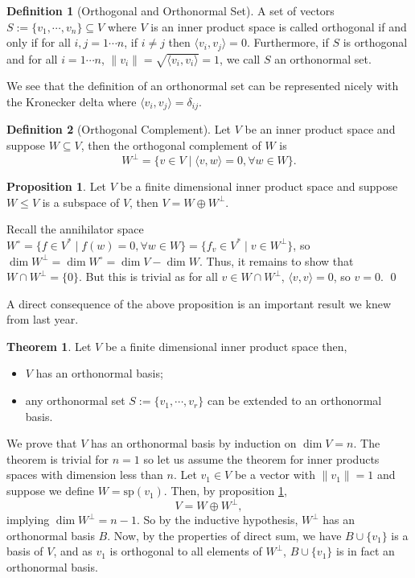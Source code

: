 \documentclass[
]{article}
\theoremstyle{definition}
\newtheorem{theorem}{Theorem}
\newtheorem{prop}{Proposition}[section]
\theoremstyle{definition}
\newtheorem{definition}{Definition}[section]
\begin{document}
\begin{definition}[Orthogonal and Orthonormal Set]
  A set of vectors \(S := \{v_1, \cdots, v_n\} \subseteq V\) where \(V\) is 
  an inner product space is called orthogonal if and only if for all 
  \(i, j = 1 \cdots n\), if \(i \neq j\) then \(\langle v_i, v_j \rangle = 0\). 
  Furthermore, if \(S\) is orthogonal and for all \(i = 1 \cdots n\), 
  \(\| v_i \| = \sqrt{\langle v_i, v_i \rangle} = 1\), we call \(S\) an 
  orthonormal set.
\end{definition}

We see that the definition of an orthonormal set can be represented
nicely with the Kronecker delta where
\(\langle v_i, v_j \rangle = \delta_{ij}\).

\begin{definition}[Orthogonal Complement]
  Let \(V\) be an inner product space and suppose \(W \subseteq V\), then the 
  orthogonal complement of \(W\) is 
  \[W^{\bot} = \{v \in V \mid \langle v, w \rangle = 0, \forall w \in W\}.\]
\end{definition}

\begin{prop}\label{dsumorth}
  Let \(V\) be a finite dimensional inner product space and suppose \(W \le V\) 
  is a subspace of \(V\), then \(V = W \oplus W^\bot\).
\end{prop}
\proof

Recall the annihilator space
\(W^\circ = \{f \in V^* \mid f(w) = 0, \forall w \in W\}  = \{f_v \in V^* \mid v \in W^\bot\}\),
so \(\dim W^\bot = \dim W^\circ =  \dim V - \dim W\). Thus, it remains
to show that \(W \cap W^\bot = \{0\}\). But this is trivial as for all
\(v \in W \cap W^\bot\), \(\langle v, v \rangle = 0\), so \(v = 0\).
\qed

A direct consequence of the above proposition is an important result we
knew from last year.

\begin{theorem}
  Let \(V\) be a finite dimensional inner product space then,
  \begin{itemize}
    \item \(V\) has an orthonormal basis;
    \item any orthonormal set \(S := \{v_1, \cdots, v_r\}\) can be extended to an 
      orthonormal basis.
  \end{itemize}
\end{theorem}
\proof

We prove that \(V\) has an orthonormal basis by induction on
\(\dim V = n\). The theorem is trivial for \(n = 1\) so let us assume
the theorem for inner products spaces with dimension less than \(n\).
Let \(v_1 \in V\) be a vector with \(\| v_1 \| = 1\) and suppose we
define \(W = \text{sp}(v_1)\). Then, by proposition \ref{dsumorth},
\[V = W \oplus W^\bot,\] implying \(\dim W^\bot = n - 1\). So by the
inductive hypothesis, \(W^\bot\) has an orthonormal basis \(B\). Now, by
the properties of direct sum, we have \(B \cup \{v_1\}\) is a basis of
\(V\), and as \(v_1\) is orthogonal to all elements of \(W^\bot\),
\(B \cup \{v_1\}\) is in fact an orthonormal basis.
\end{document}
